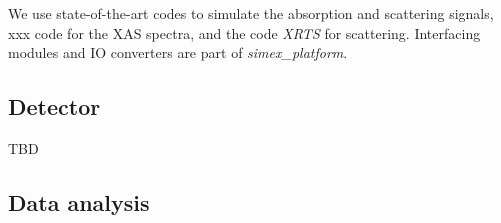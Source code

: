 \documentclass[a4paper]{article}
\begin{document}
We use state-of-the-art codes to simulate the absorption and scattering signals, xxx code for the XAS spectra, and
the code \textit{XRTS} \cite{Gregori2009, Fortmann2010} for scattering. Interfacing  modules and
IO converters are part of \textit{simex\_platform}.

\subsection{Detector}
TBD
\subsection{Data analysis}

\printbibliography
\end{document}
